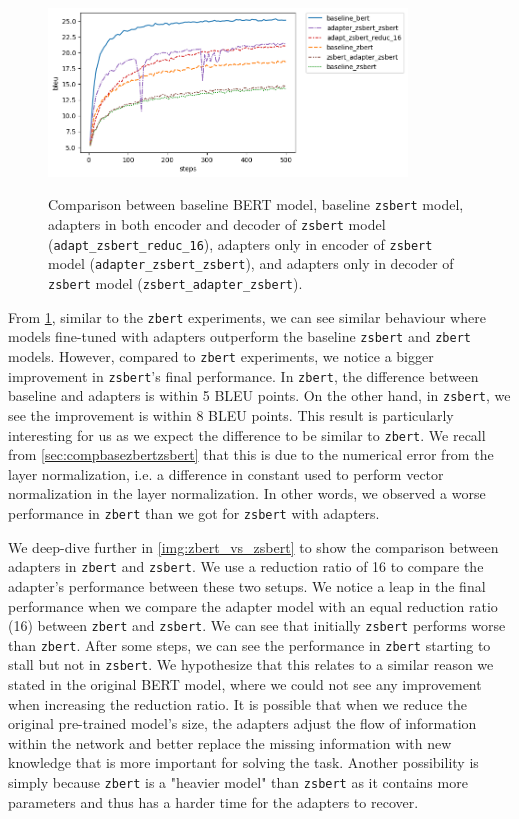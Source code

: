 \begin{figure}[h]
    {\includegraphics[width=0.85\textwidth]{img/zsbert_pos.png}}
    \centering
    \caption[Comparison between baseline BERT and \texttt{zsbert} models.]{Comparison between baseline BERT model, baseline \texttt{zsbert} model, adapters in both encoder and decoder of \texttt{zsbert} model (\texttt{adapt\_zsbert\_reduc\_16}), adapters only in encoder of \texttt{zsbert} model (\texttt{adapter\_zsbert\_zsbert}), and adapters only in decoder of \texttt{zsbert} model (\texttt{zsbert\_adapter\_zsbert}).}
    \label{img:zsbert_pos}
\end{figure}

From \cref{img:zsbert_pos}, similar to the \texttt{zbert} experiments, we can see similar behaviour where models fine-tuned with adapters outperform the baseline \texttt{zsbert} and \texttt{zbert} models. However, compared to \texttt{zbert} experiments, we notice a bigger improvement in \texttt{zsbert}'s final performance. In \texttt{zbert}, the difference between baseline and adapters is within 5 BLEU points. On the other hand, in \texttt{zsbert}, we see the improvement is within 8 BLEU points. This result is particularly interesting for us as we expect the difference to be similar to \texttt{zbert}. We recall from \cref{sec:compbasezbertzsbert} that this is due to the numerical error from the layer normalization, i.e. a difference in constant used to perform vector normalization in the layer normalization. In other words, we observed a worse performance in \texttt{zbert} than we got for \texttt{zsbert} with adapters.

We deep-dive further in \cref{img:zbert_vs_zsbert} to show the comparison between adapters in \texttt{zbert} and \texttt{zsbert}. We use a reduction ratio of 16 to compare the adapter's performance between these two setups. We notice a leap in the final performance when we compare the adapter model with an equal reduction ratio (16) between \texttt{zbert} and \texttt{zsbert}. We can see that initially \texttt{zsbert} performs worse than \texttt{zbert}. After some steps, we can see the performance in \texttt{zbert} starting to stall but not in \texttt{zsbert}. We hypothesize that this relates to a similar reason we stated in the original BERT model, where we could not see any improvement when increasing the reduction ratio. It is possible that when we reduce the original pre-trained model's size, the adapters adjust the flow of information within the network and better replace the missing information with new knowledge that is more important for solving the task. Another possibility is simply because \texttt{zbert} is a "heavier model" than \texttt{zsbert} as it contains more parameters and thus has a harder time for the adapters to recover.

